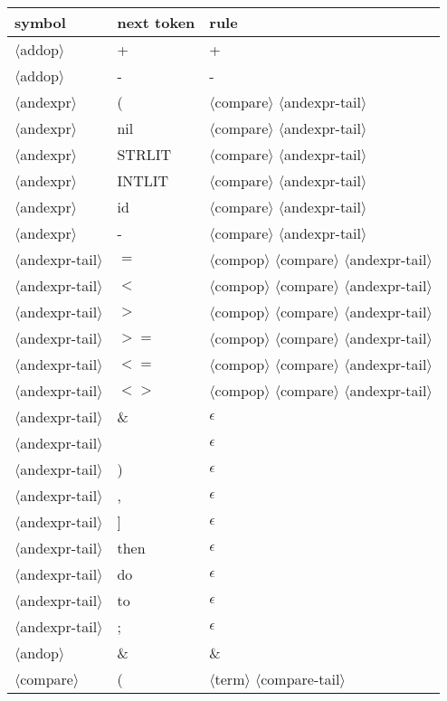 \documentclass[11pt, fleqn]{article}
\newcommand{\atag}[1]{$\langle$#1$\rangle$}
\begin{document}
\begin{longtable}{l|l|l}
symbol							&	next token	&	rule									\\
\hline
\atag{addop}						&	+			&	+									\\
\atag{addop}						&	-			&	-									\\
\atag{andexpr} 					&	(			&	\atag{compare} \atag{andexpr-tail}	\\
\atag{andexpr} 					&	nil			&	\atag{compare} \atag{andexpr-tail}	\\
\atag{andexpr} 					&	STRLIT		&	\atag{compare} \atag{andexpr-tail}	\\
\atag{andexpr} 					&	INTLIT		&	\atag{compare} \atag{andexpr-tail}	\\
\atag{andexpr} 					&	id			&	\atag{compare} \atag{andexpr-tail}	\\
\atag{andexpr} 					&	-			&	\atag{compare} \atag{andexpr-tail}	\\
\atag{andexpr-tail}				&	$=$			&	\atag{compop} \atag{compare} \atag{andexpr-tail}	\\
\atag{andexpr-tail}				&	$<$			&	\atag{compop} \atag{compare} \atag{andexpr-tail}	\\
\atag{andexpr-tail}				&	$>$			&	\atag{compop} \atag{compare} \atag{andexpr-tail}	\\
\atag{andexpr-tail}				&	$>=$			&	\atag{compop} \atag{compare} \atag{andexpr-tail}	\\
\atag{andexpr-tail}				&	$<=$			&	\atag{compop} \atag{compare} \atag{andexpr-tail}	\\
\atag{andexpr-tail}				&	$<>$			&	\atag{compop} \atag{compare} \atag{andexpr-tail}	\\
\atag{andexpr-tail}				&	\&			&	$\epsilon$	\\
\atag{andexpr-tail}				&	\textbar		&	$\epsilon$	\\
\atag{andexpr-tail}				&	)			&	$\epsilon$	\\
\atag{andexpr-tail}				&	,			&	$\epsilon$	\\
\atag{andexpr-tail}				&	]			&	$\epsilon$	\\
\atag{andexpr-tail}				&	then			&	$\epsilon$	\\
\atag{andexpr-tail}				&	do			&	$\epsilon$	\\
\atag{andexpr-tail}				&	to			&	$\epsilon$	\\
\atag{andexpr-tail}				&	;			&	$\epsilon$	\\
\atag{andop}						&	\&			&	\&										\\
\atag{compare} 					&	(			&	\atag{term} \atag{compare-tail}	\\

\end{longtable}
\end{document}
